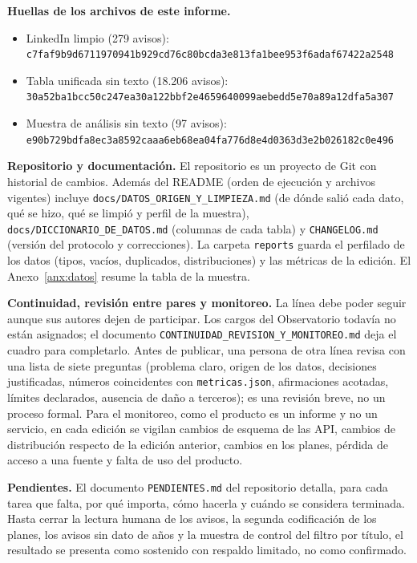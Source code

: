 \documentclass[11pt,a4paper]{article}
\begin{document}
\textbf{Huellas de los archivos de este informe.}
\begin{itemize}
\item LinkedIn limpio (279 avisos):\\ {\footnotesize\texttt{c7faf9b9d6711970941b929cd76c80bcda3e813fa1bee953f6adaf67422a2548}}
\item Tabla unificada sin texto (18.206 avisos):\\ {\footnotesize\texttt{30a52ba1bcc50c247ea30a122bbf2e4659640099aebedd5e70a89a12dfa5a307}}
\item Muestra de análisis sin texto (97 avisos):\\ {\footnotesize\texttt{e90b729bdfa8ec3a8592caaa6eb68ea04fa776d8e4d0363d3e2b026182c0e496}}
\end{itemize}

\textbf{Repositorio y documentación.} El repositorio es un proyecto de Git con historial de cambios. Además del README (orden de ejecución y archivos vigentes) incluye \texttt{docs/DATOS\_ORIGEN\_Y\_LIMPIEZA.md} (de dónde salió cada dato, qué se hizo, qué se limpió y perfil de la muestra), \texttt{docs/DICCIONARIO\_DE\_DATOS.md} (columnas de cada tabla) y \texttt{CHANGELOG.md} (versión del protocolo y correcciones). La carpeta \texttt{reports} guarda el perfilado de los datos (tipos, vacíos, duplicados, distribuciones) y las métricas de la edición. El Anexo~\ref{anx:datos} resume la tabla de la muestra.

\textbf{Continuidad, revisión entre pares y monitoreo.} La línea debe poder seguir aunque sus autores dejen de participar. Los cargos del Observatorio todavía no están asignados; el documento \texttt{CONTINUIDAD\_REVISION\_Y\_MONITOREO.md} deja el cuadro para completarlo. Antes de publicar, una persona de otra línea revisa con una lista de siete preguntas (problema claro, origen de los datos, decisiones justificadas, números coincidentes con \texttt{metricas.json}, afirmaciones acotadas, límites declarados, ausencia de daño a terceros); es una revisión breve, no un proceso formal. Para el monitoreo, como el producto es un informe y no un servicio, en cada edición se vigilan cambios de esquema de las API, cambios de distribución respecto de la edición anterior, cambios en los planes, pérdida de acceso a una fuente y falta de uso del producto.

\textbf{Pendientes.} El documento \texttt{PENDIENTES.md} del repositorio detalla, para cada tarea que falta, por qué importa, cómo hacerla y cuándo se considera terminada. Hasta cerrar la lectura humana de los avisos, la segunda codificación de los planes, los avisos sin dato de años y la muestra de control del filtro por título, el resultado se presenta como sostenido con respaldo limitado, no como confirmado.
\end{document}
